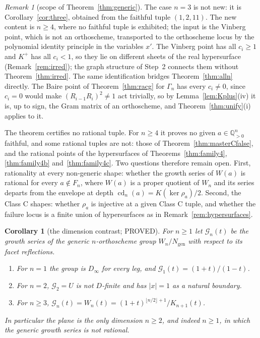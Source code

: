 \documentclass[11pt]{article}
\newtheorem{corollary}[theorem]{Corollary}
\theoremstyle{definition}
\theoremstyle{remark}
\newtheorem{remark}[theorem]{Remark}
\theoremstyle{definition}
\newcommand{\Q}{\mathbb{Q}}
\newcommand{\cd}{\operatorname{cd}}
\begin{document}
\begin{remark}[scope of Theorem~\ref{thm:generic}]\label{rem:genericscope}
The case $n=3$ is not new: it is Corollary~\ref{cor:three}, obtained from the faithful tuple
$(1,2,11)$. The new content is $n\ge4$, where no faithful tuple is exhibited; the input is the
Vinberg point, which is not an orthoscheme, transported to the orthoscheme locus by the polynomial
identity principle in the variables $x'$. The Vinberg point has all $c_i\ge1$ and $K^+$ has all
$c_i<1$, so they lie on different sheets of the real hypersurface (Remark~\ref{rem:irred}); the
graph structure of Step~2 connects them without Theorem~\ref{thm:irred}. The same identification
bridges Theorem~\ref{thm:alln} directly. The Baire point of Theorem~\ref{thm:racg} for $\Gamma_n$
has every $c_i\ne0$, since $c_i=0$ would make $(R_{i-1}R_i)^2\ne1$ act trivially, so by
Lemma~\ref{lem:Kplus}(iv) it is, up to sign, the Gram matrix of an orthoscheme, and
Theorem~\ref{thm:unify}(i) applies to it.

The theorem certifies no rational tuple. For $n\ge4$ it proves no given $a\in\Q_{>0}^n$ faithful,
and some rational tuples are not: those of Theorem~\ref{thm:masterCfalse}, and the rational points
of the hypersurfaces of Theorems~\ref{thm:family4}, \ref{thm:family4b} and~\ref{thm:family4c}.
Two questions therefore remain open. First, rationality at every non-generic shape: whether the
growth series of $W(a)$ is rational for every $a\notin F_n$, where $W(a)$ is a proper quotient of
$W_n$ and its series departs from the envelope at depth $\cd_n(a)=K(\ker\rho_a)/2$. Second, the Class C shapes:
whether $\rho_a$ is injective at a given Class C tuple, and whether the failure locus is a finite
union of hypersurfaces as in Remark~\ref{rem:hypersurfaces}.
\end{remark}

\begin{corollary}[the dimension contrast; PROVED]\label{cor:dimcontrast}
For $n\ge1$ let $\mathcal G_n(t)$ be the growth series of the generic $n$-orthoscheme group
$W_n/N_{\mathrm{gen}}$ with respect to its facet reflections.
\begin{enumerate}[label=\textup{(\roman*)},leftmargin=2.4em]
\item For $n=1$ the group is $D_\infty$ for every leg, and $\mathcal G_1(t)=(1+t)/(1-t)$.
\item For $n=2$, $\mathcal G_2=U$ is not $D$-finite and has $|x|=1$ as a natural boundary.
\item For $n\ge3$, $\mathcal G_n(t)=W_n(t)=(1+t)^{\lfloor n/2\rfloor+1}/K_{n+1}(t)$.
\end{enumerate}
In particular the plane is the only dimension $n\ge2$, and indeed $n\ge1$, in which the generic
growth series is not rational.
\end{corollary}
\end{document}
